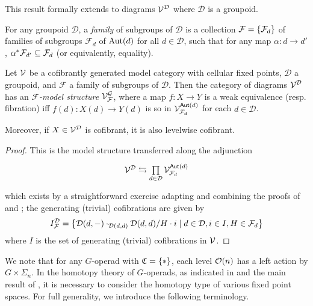 \documentclass[a4paper,10pt
,draft
]{article}%
\renewcommand{\F}{\mathcal F}
\renewcommand{\1}{\eta}%
\begin{document}
This result formally extends to diagrams $\mathcal V^{\mathcal D}$ where $\mathcal D$ is a groupoid.
\begin{definition}
      For any groupoid $\mathcal D$, a \textit{family} of subgroups of $\mathcal D$ is
      a collection $\F = \set{\F_d}$ of families of subgroups $\F_d$ of $\operatorname{Aut}(d)$ for all $d \in \mathcal D$,
      such that for any map $\alpha: d \to d'$, $\alpha^{\**}\F_{d'} \subseteq \F_d$ (or equivalently, equality).
\end{definition}

\begin{proposition}
      \label{TRANS_MODEL_PROP}
      Let $\mathcal V$ be a cofibrantly generated model category with cellular fixed points, $\mathcal D$ a groupoid, and $\F$ a family of subgroups of $\mathcal D$.
      Then the category of diagrams $\mathcal V^{\mathcal D}$ has an \textit{$\F$-model structure} $\V^\G_\F$, where
      a map $f: X \to Y$ is a
      weak equivalence (resp. fibration) iff $f(d): X(d) \to Y(d)$ is so in $\V^{\mathsf{Aut}(d)}_{\F_d}$ for each $d \in \mathcal D$.

      Moreover, if $X \in \mathcal V^{\mathcal D}$ is cofibrant, it is also levelwise cofibrant.
\end{proposition}
\begin{proof}
      This is the model structure transferred along the adjunction
      \begin{equation}
            \begin{tikzcd}
                  \V^{\mathcal D} \leftrightarrows
                  \mathop{\prod}\limits_{d \in \mathcal D}\V^{\mathsf{Aut}(d)}_{\F_d}
            \end{tikzcd}
      \end{equation}
      which exists by a straightforward exercise adapting and combining the proofs of
      \cite[Thm 11.6.1]{Hir03} and \cite[Prop 2.6]{Ste16};
      the generating (trivial) cofibrations are given by
      \begin{equation}
            I^{\mathcal D}_\F = \sets{\mathcal D(d,-) \cdot_{\mathcal D(d,d)} \mathcal D(d,d)/H \cdot i}{d \in \mathcal D, i \in I, H \in \F_d}
      \end{equation}
      where $I$ is the set of generating (trivial) cofibrations in $\mathcal V$.
\end{proof}

We note that for any $G$-operad with $\mathfrak C = \set{\**}$, each level $\mathcal{O}(n)$ has a left action by $G \times \Sigma_n$.
In the homotopy theory of $G$-operads, as indicated in \cite{BH15} and the main result of \cite{BP_geo}, it is
necessary to consider the homotopy type of various fixed point spaces.
For full generality, we introduce the following terminology.
\end{document}

